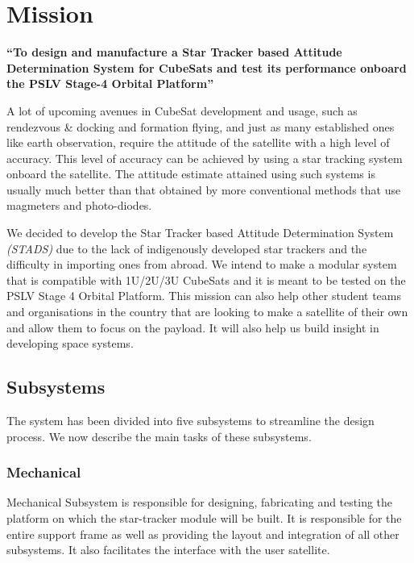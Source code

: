 \documentclass[../../main.tex]{subfiles}
\begin{document}
\chapter{Mission}
\thispagestyle{fancy}


\textbf{``To design and manufacture a Star Tracker based Attitude Determination System for CubeSats and test its performance onboard the PSLV Stage-4 Orbital Platform''}

A lot of upcoming avenues in CubeSat development and usage, such as rendezvous \& docking and formation flying, and just as many established ones like earth observation, require the attitude of the satellite with a high level of accuracy. This level of accuracy can be achieved by using a star tracking system onboard the satellite. The attitude estimate attained using such systems is usually much better than that obtained by more conventional methods that use magmeters and photo-diodes.


We decided to develop the Star Tracker based Attitude Determination System \emph{(STADS)} due to the lack of indigenously developed star trackers and the difficulty in importing ones from abroad. We intend to make a modular system that is compatible with 1U/2U/3U CubeSats and it is meant to be tested on the PSLV Stage 4 Orbital Platform. This mission can also help other student teams and organisations in the country that are looking to make a satellite of their own and allow them to focus on the payload. It will also help us build insight in developing space systems.

\section*{Subsystems}

    The system has been divided into five subsystems to streamline the design process. We now describe the main tasks of these subsystems.

    \subsection*{Mechanical}
    Mechanical Subsystem is responsible for designing, fabricating and testing the platform on which the star-tracker module will be built. It is responsible for the entire support frame as well as providing the layout and integration of all other subsystems. It also facilitates the interface with the user satellite. 
    
\end{document}
